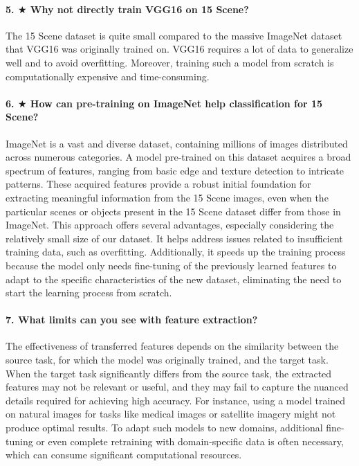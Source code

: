 \paragraph{5. $\bigstar$ Why not directly train VGG16 on 15 Scene?}
The 15 Scene dataset is quite small compared to the massive ImageNet dataset that VGG16 was originally trained on. VGG16 requires a lot of data to generalize well and to avoid overfitting. Moreover, training such a model from scratch is computationally expensive and time-consuming.


\paragraph{6. $\bigstar$ How can pre-training on ImageNet help classification for 15 Scene?}
ImageNet is a vast and diverse dataset, containing millions of images distributed across numerous categories. A model pre-trained on this dataset acquires a broad spectrum of features, ranging from basic edge and texture detection to intricate patterns. These acquired features provide a robust initial foundation for extracting meaningful information from the 15 Scene images, even when the particular scenes or objects present in the 15 Scene dataset differ from those in ImageNet. This approach offers several advantages, especially considering the relatively small size of our dataset. It helps address issues related to insufficient training data, such as overfitting. Additionally, it speeds up the training process because the model only needs fine-tuning of the previously learned features to adapt to the specific characteristics of the new dataset, eliminating the need to start the learning process from scratch.

\paragraph{7. What limits can you see with feature extraction?}
The effectiveness of transferred features depends on the similarity between the source task, for which the model was originally trained, and the target task. When the target task significantly differs from the source task, the extracted features may not be relevant or useful, and they may fail to capture the nuanced details required for achieving high accuracy. For instance, using a model trained on natural images for tasks like medical images or satellite imagery might not produce optimal results. To adapt such models to new domains, additional fine-tuning or even complete retraining with domain-specific data is often necessary, which can consume significant computational resources.

